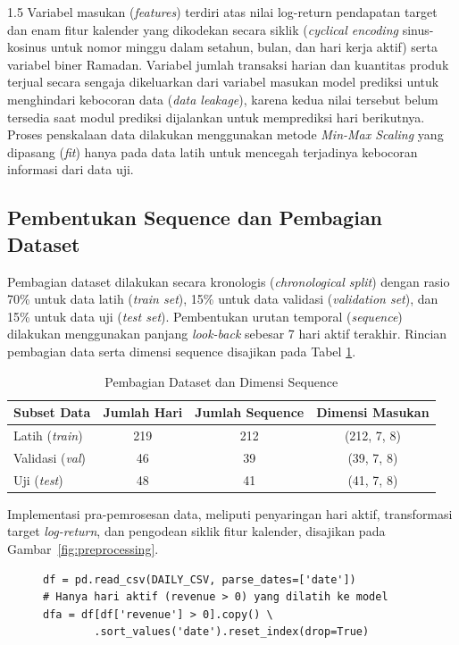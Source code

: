 \documentclass[12pt, a4paper, onecolumn, oneside]{report}
\begin{document}
\begin{spacing}{1.5}
Variabel masukan (\textit{features}) terdiri atas nilai log-return pendapatan target dan enam fitur kalender yang dikodekan secara siklik (\textit{cyclical encoding} sinus-kosinus untuk nomor minggu dalam setahun, bulan, dan hari kerja aktif) serta variabel biner Ramadan. Variabel jumlah transaksi harian dan kuantitas produk terjual secara sengaja dikeluarkan dari variabel masukan model prediksi untuk menghindari kebocoran data (\textit{data leakage}), karena kedua nilai tersebut belum tersedia saat modul prediksi dijalankan untuk memprediksi hari berikutnya. Proses penskalaan data dilakukan menggunakan metode \textit{Min-Max Scaling} yang dipasang (\textit{fit}) hanya pada data latih untuk mencegah terjadinya kebocoran informasi dari data uji.

\subsection{Pembentukan Sequence dan Pembagian Dataset}
Pembagian dataset dilakukan secara kronologis (\textit{chronological split}) dengan rasio 70\% untuk data latih (\textit{train set}), 15\% untuk data validasi (\textit{validation set}), dan 15\% untuk data uji (\textit{test set}). Pembentukan urutan temporal (\textit{sequence}) dilakukan menggunakan panjang \textit{look-back} sebesar 7 hari aktif terakhir. Rincian pembagian data serta dimensi sequence disajikan pada Tabel \ref{tab:pembagian_data_sequence}.

\begin{table}[H]
\centering
\caption{Pembagian Dataset dan Dimensi Sequence}
\label{tab:pembagian_data_sequence}
\begin{tabular}{|l|c|c|c|}
\hline
\textbf{Subset Data} & \textbf{Jumlah Hari} & \textbf{Jumlah Sequence} & \textbf{Dimensi Masukan} \\ \hline
Latih (\textit{train}) & 219 & 212 & (212, 7, 8) \\ \hline
Validasi (\textit{val}) & 46 & 39 & (39, 7, 8) \\ \hline
Uji (\textit{test}) & 48 & 41 & (41, 7, 8) \\ \hline
\end{tabular}
\end{table}

Implementasi pra-pemrosesan data, meliputi penyaringan hari aktif, transformasi target \textit{log-return}, dan pengodean siklik fitur kalender, disajikan pada Gambar~\ref{fig:preprocessing}.

\begin{figure}[H]
\begin{lstlisting}
df = pd.read_csv(DAILY_CSV, parse_dates=['date'])
# Hanya hari aktif (revenue > 0) yang dilatih ke model
dfa = df[df['revenue'] > 0].copy() \
        .sort_values('date').reset_index(drop=True)


\end{lstlisting}
\end{figure}
\end{spacing}
\end{document}
